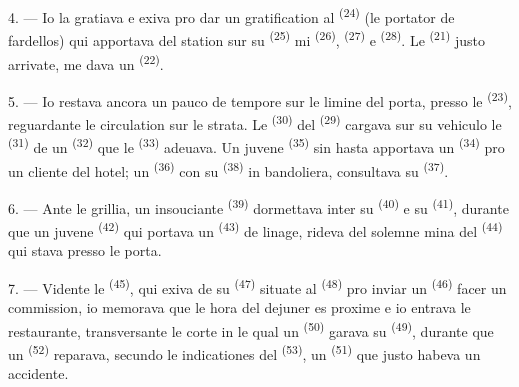 4. --- Io la gratiava e exiva pro dar un gratification al 
\textsuperscript{(24)} (le portator de fardellos) qui apportava del station sur
su  \textsuperscript{(25)} mi 
\textsuperscript{(26)},  \textsuperscript{(27)} e  \textsuperscript{(28)}. Le 
\textsuperscript{(21)} justo arrivate, me dava un 
\textsuperscript{(22)}.

5. --- Io restava ancora un pauco de tempore sur le limine del porta, presso le
 \textsuperscript{(23)}, reguardante le circulation sur
le strata. Le  \textsuperscript{(30)} del 
\textsuperscript{(29)} cargava sur su vehiculo le 
\textsuperscript{(31)} de un  \textsuperscript{(32)} que le
 \textsuperscript{(33)} adeuava. Un juvene
 \textsuperscript{(35)} sin hasta apportava un
 \textsuperscript{(34)} pro un cliente del hotel; un
 \textsuperscript{(36)} con su 
\textsuperscript{(38)} in bandoliera, consultava su 
\textsuperscript{(37)}.

\VUsaut{4.0mm}
\VUsaut{3.0mm}

6. --- Ante le grillia, un insouciante 
\textsuperscript{(39)} dormettava inter su 
\textsuperscript{(40)} e su  \textsuperscript{(41)},
durante que un juvene  \textsuperscript{(42)} qui portava un
 \textsuperscript{(43)} de linage, rideva del solemne mina del
 \textsuperscript{(44)} qui stava presso le porta.

7. --- Vidente le  \textsuperscript{(45)}, qui exiva de su
 \textsuperscript{(47)} situate al 
\textsuperscript{(48)} pro inviar un  \textsuperscript{(46)}
facer un commission, io memorava que le hora del dejuner es proxime e io
entrava le restaurante, transversante le corte in le qual un 
\textsuperscript{(50)} garava su  \textsuperscript{(49)},
durante que un  \textsuperscript{(52)} reparava, secundo le
indicationes del  \textsuperscript{(53)}, un  \textsuperscript{(51)} que justo habeva un accidente.

